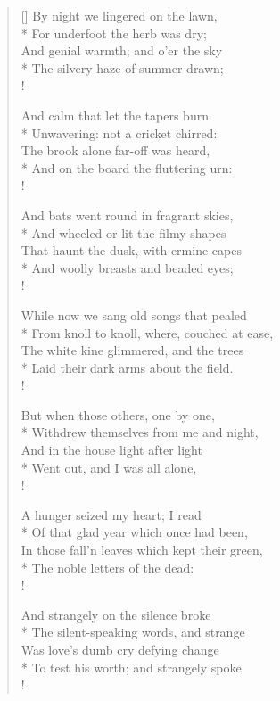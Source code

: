 \documentclass[MAIN]{subfiles}
\begin{document}
\settowidth{\versewidth}{By night we lingered on the lawn,}
\begin{verse}[\versewidth]
By night we lingered on the lawn,\\*
For underfoot the herb was dry;\\
And genial warmth; and o'er the sky\\*
The silvery haze of summer drawn;\\!

And calm that let the tapers burn\\*
Unwavering: not a cricket chirred:\\
The brook alone far-off was heard,\\*
And on the board the fluttering urn:\\!

And bats went round in fragrant skies,\\*
And wheeled or lit the filmy shapes\\
That haunt the dusk, with ermine capes\\*
And woolly breasts and beaded eyes;\\!

While now we sang old songs that pealed\\*
From knoll to knoll, where, couched at ease,\\ 
The white kine glimmered, and the trees\\*
Laid their dark arms about the field.\\!

But when those others, one by one,\\*
Withdrew themselves from me and night,\\
And in the house light after light\\*
Went out, and I was all alone,\\!

A hunger seized my heart; I read\\*
Of that glad year which once had been,\\
In those fall'n leaves which kept their green,\\*
The noble letters of the dead:\\!

And strangely on the silence broke\\*
The silent-speaking words, and strange\\
Was love's dumb cry defying change\\*
To test his worth; and strangely spoke\\!


\end{verse}
\end{document}
